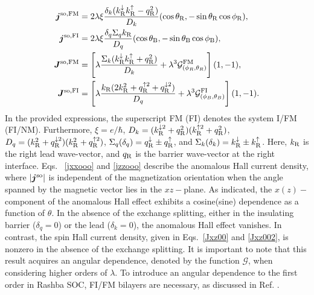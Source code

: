 \documentclass[10pt,pr,twocolumn,showpacs,amssymb,floatfix,superscriptaddress]{revtex4-1}
\newcommand{\tx}{\text}
\newcommand{\dna}{\downarrow}
\newcommand{\upa}{\uparrow}
\newcommand{\dlt}{\delta}
\newcommand{\lam}{\lambda}
\newcommand{\Sg}{\Sigma}
\begin{document}
\begin{align}
\label{jxxooo}
 \bm j^{\rm so, \tx{FM}} &= 2\lam\xi\frac{\dlt_k(k_{\rm R}^\dna k_{\rm R}^\upa - q_{\rm R}^2)}{D_{k}} (\cos \theta_{\rm R}, -\sin \theta_{\rm R}\cos \phi_{\rm R}), \\
\label{jzzooo}
\bm j^{\rm so, \tx{FI}} &= 2\lam\xi\frac{ \dlt_q \Sg_q k_{\rm R}}{D_{q}}(\cos \theta_{\rm B}, -\sin \theta_{\rm B}\cos\phi_{\rm B}), \\
\label{Jxz00}
\bm J^{\rm so, \tx{FM}} &= \left [ \lam \frac{ \Sg_k (k_{\rm R}^\dna k_{\rm R}^\upa + q_{\rm R}^2)}{D_k}  + \lam^3\mathcal{G}^{\text{FM}}_{(\phi_{R},\theta_{R})} \right] (1, -1),\\
\bm J^{\rm so, \tx{FI}} &=   \left [ \lam\frac{ k_{\rm R} (2k_{\rm R}^2 + q_{\rm R}^{\upa 2} + q_{\rm R}^{\dna 2})}{D_q} + \lam^3\mathcal{G}^{\text{FI}}_{(\phi_{B},\theta_{B})}\right] (1, -1). 
 \label{Jxz002}
\end{align}
In the provided expressions, the superscript FM (FI) denotes the system I/FM (FI/NM). Furthermore, $\xi = e/\hbar$, $D_{k}=(k_{\rm R}^{\downarrow 2} + q_{\rm R}^{2})(k_{\rm R}^{\uparrow 2} + q_{\rm R}^{2})$, $D_{q} = (k_{\rm R}^2 + q_{\rm R}^{\downarrow 2})(k_{\rm R}^2 + q_{\rm R}^{\uparrow 2})$, $\Sigma_q(\delta_q) = q_{\rm R}^{\downarrow} \pm q_{\rm R}^{\uparrow}$, and $\Sigma_k(\delta_k)=k_{\rm R}^{\downarrow} \pm k_{\rm R}^{\uparrow}$. Here, $k_{\rm R}$ is the right lead wave-vector, and $q_{\rm R}$ is the barrier wave-vector at the right interface. Eqs.~ \eqref{jxxooo} and \eqref{jzzooo} describe the anomalous Hall current density, where $|\bm j^{\rm so}|$ is independent of the magnetization orientation when the angle spanned by the magnetic vector lies in the $xz-$plane. As indicated, the $x$$(z)-$component of the anomalous Hall effect exhibits a cosine(sine) dependence as a function of $\theta$. In the absence of the exchange splitting, either in the insulating barrier ($\delta_q = 0$) or the lead ($\delta_k = 0$), the anomalous Hall effect vanishes. In contrast, the spin Hall current density, given in Eqs.~\eqref{Jxz00} and \eqref{Jxz002}, is nonzero in the absence of the exchange splitting. It is important to note that this result acquires an angular dependence, denoted by the function $\mathcal{G}$, when considering higher orders of $\lambda$. To introduce an angular dependence to the first order in Rashba SOC, FI/FM bilayers are necessary, as discussed in Ref. .
\end{document}
